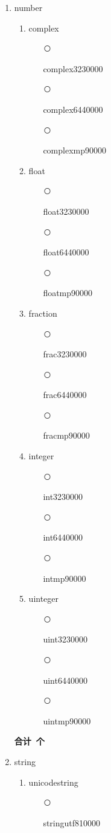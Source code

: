 \documentclass[11pt]{ctexrep}
\newcounter{typelist}
\newcommand{\circnum}{\addtocounter{typelist}{1}\textcircled{\tiny\thetypelist}}
\begin{document}
\begin{enumerate}
\item number
	\setcounter{typelist}{0}
	\begin{enumerate}
	\item complex
		\begin{enumerate}
		\item[\circnum] complex32\hfill 30000
		\item[\circnum] complex64\hfill 40000
		\item[\circnum] complexmp\hfill 90000
		\end{enumerate}
	\item float
		\begin{enumerate}
		\item[\circnum] float32\hfill 30000
		\item[\circnum] float64\hfill 40000
		\item[\circnum] floatmp\hfill 90000
		\end{enumerate}
	\item fraction
		\begin{enumerate}
		\item[\circnum] frac32\hfill 30000
		\item[\circnum] frac64\hfill 40000
		\item[\circnum] fracmp\hfill 90000
		\end{enumerate}
	\item integer
		\begin{enumerate}
		\item[\circnum] int32\hfill 30000
		\item[\circnum] int64\hfill 40000
		\item[\circnum] intmp\hfill 90000
		\end{enumerate}
	\item uinteger
		\begin{enumerate}
		\item[\circnum] uint32\hfill 30000
		\item[\circnum] uint64\hfill 40000
		\item[\circnum] uintmp\hfill 90000
		\end{enumerate}
	\end{enumerate}
	\textbf{合计\thetypelist\ 个}
\item string
	\setcounter{typelist}{0}
	\begin{enumerate}
	\item unicodestring
		\begin{enumerate}
		\item[\circnum] stringutf8\hfill 10000

\end{enumerate}
\end{enumerate}
\end{enumerate}
\end{document}
